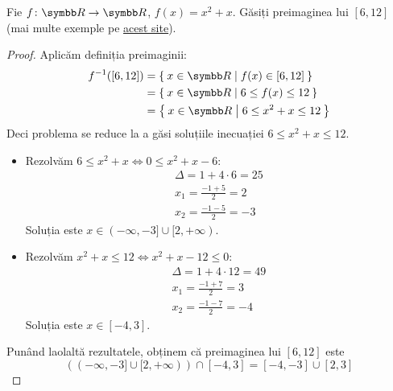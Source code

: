 \begin{exercise}
Fie \(\function{f}{\reals}{\reals}\), \(f(x) = x^2 + x\). Găsiți preimaginea lui \([6, 12]\) (mai multe exemple pe \href{http://mathonline.wikidot.com/determining-the-inverse-image-of-a-set-examples}{acest site}).
\end{exercise}
\begin{proof}
Aplicăm definiția preimaginii:
\begin{align*}
    f^{-1}([6, 12]) &= \Set{ x \in \reals | f(x) \in [6, 12] } \\
    &= \Set{ x \in \reals | 6 \leq f(x) \leq 12 } \\
    &= \Set{ x \in \reals | 6 \leq x^2 + x \leq 12 }
\end{align*}
Deci problema se reduce la a găsi soluțiile inecuației \(6 \leq x^2 + x \leq 12\).

\begin{itemize}
    \item Rezolvăm \(6 \leq x^2 + x \iff 0 \leq x^2 + x - 6\):
    \begin{gather*}
        \Delta = 1 + 4 \cdot 6 = 25 \\
        x_1 = \frac{-1 + 5}{2} = 2 \\
        x_2 = \frac{-1 - 5}{2} = -3
    \end{gather*}
    Soluția este \(x \in (-\infty, -3] \cup [2, +\infty)\).

    \item Rezolvăm \(x^2 + x \leq 12 \iff x^2 + x - 12 \leq 0\):
    \begin{gather*}
        \Delta = 1 + 4 \cdot 12 = 49 \\
        x_1 = \frac{-1 + 7}{2} = 3 \\
        x_2 = \frac{-1 - 7}{2} = -4
    \end{gather*}
    Soluția este \(x \in [-4, 3]\).

\end{itemize}

Punând laolaltă rezultatele, obținem că preimaginea lui \([6, 12]\) este
\[
    ((-\infty, -3] \cup [2, +\infty)) \cap [-4, 3] = [-4, -3] \cup [2, 3]
\]
\end{proof}

